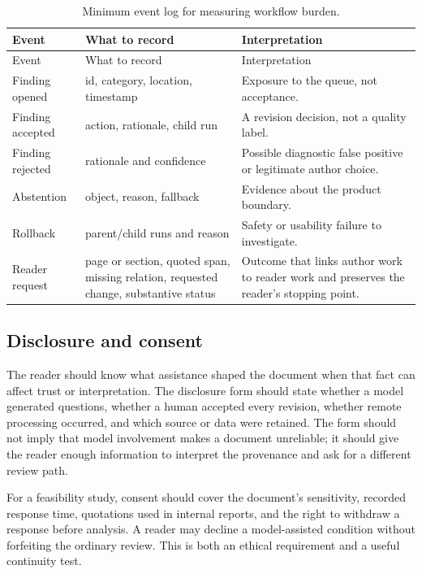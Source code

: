\begin{longtable}{@{}p{}p{}p{}@{}}
\caption{Minimum event log for measuring workflow burden.}
\label{tab:author-log}\\
\toprule
Event & What to record & Interpretation \\
\midrule
\endfirsthead
\toprule
Event & What to record & Interpretation \\
\midrule
\endhead
Finding opened & id, category, location, timestamp & Exposure to the queue,
not acceptance. \\
Finding accepted & action, rationale, child run & A revision decision, not a
quality label. \\
Finding rejected & rationale and confidence & Possible diagnostic false
positive or legitimate author choice. \\
Abstention & object, reason, fallback & Evidence about the product boundary. \\
Rollback & parent/child runs and reason & Safety or usability failure to
investigate. \\
Reader request & page or section, quoted span, missing relation, requested
change, substantive status & Outcome that links author work to reader work and
preserves the reader's stopping point. \\
\bottomrule
\end{longtable}

\subsection{Disclosure and consent}

The reader should know what assistance shaped the document when that fact can
affect trust or interpretation. The disclosure form should state whether a
model generated questions, whether a human accepted every revision, whether
remote processing occurred, and which source or data were retained. The form
should not imply that model involvement makes a document unreliable; it should
give the reader enough information to interpret the provenance and ask for a
different review path.

For a feasibility study, consent should cover the document's sensitivity,
recorded response time, quotations used in internal reports, and the right to
withdraw a response before analysis. A reader may decline a model-assisted
condition without forfeiting the ordinary review. This is both an ethical
requirement and a useful continuity test.

